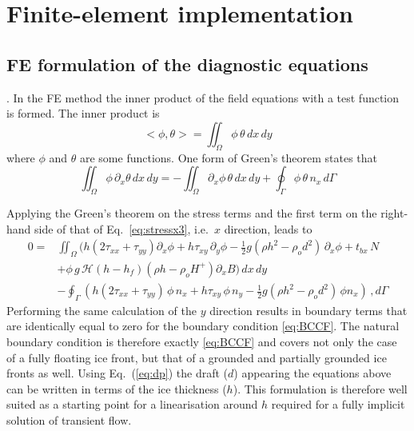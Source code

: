 \documentclass[10pt,a4paper]{book}
\newcommand{\He}{\mathcal{H}}
\newcommand{\p}{\partial}
\newcommand{\tbx}{t_{bx}}
\newcommand{\txx}{\tau_{xx}}
\newcommand{\tyy}{\tau_{yy}}
\newcommand{\txy}{\tau_{xy}}
\begin{document}
\chapter{Finite-element implementation}




\section{FE formulation of the diagnostic equations}
\label{sec:nBCs}.
In the FE method the inner product of the field equations with a test function is formed. The inner product is
\[
<\phi,\theta>=\iint_{\Omega}\phi \, \theta \, dx \, dy
\] 
where $\phi$ and $\theta$ are some functions.
One form of Green's theorem states that
\[
\iint_{\Omega}\phi \, \p_x \theta \, dx \, dy=-\iint_{\Omega} \p_x\phi \, \theta \, dx\,dy +\oint_{\Gamma}\phi \, \theta \, n_x\,d\Gamma
\]

Applying the Green's theorem on the stress terms and the first term on the right-hand side of that of
Eq.~\eqref{eq:stressx3}, i.e.\ $x$ direction, leads to
\begin{align*} 
0=&\iint_{\Omega} \Big ( h ( 2 \txx + \tyy) \p_x\phi +  h \txy \, \p_y\phi - \frac{1}{2} g (\rho h^2 - \rho_o d^2) \, \p_x\phi 
+ \tbx \, N
\\ & +\phi \, g\,\He(h-h_f) (\rho h -\rho_o H^{+}) \p_x B \Big ) \, dx \, dy
\\ & - \oint_{\Gamma} (h ( 2 \txx + \tyy) \,\phi \, n_x+  h \txy \,\phi \, n_y- \frac{1}{2} g (\rho h^2 - \rho_o d^2) \,\phi n_x)\, , d\Gamma 
\end{align*}
Performing the same calculation of the $y$ direction results in
boundary terms that are identically equal to zero for the boundary
condition \eqref{eq:BCCF}. The natural boundary condition is therefore
exactly \eqref{eq:BCCF} and covers not only the case of a fully
floating ice front, but that of a grounded and partially grounded ice
fronts as well.  Using Eq.~(\ref{eq:dp}) the draft ($d$) appearing the
equations above can be written in terms of the ice thickness
($h$). This formulation is therefore well suited as a starting point
for a linearisation around $h$ required for a fully implicit solution
of transient flow.
\end{document}
